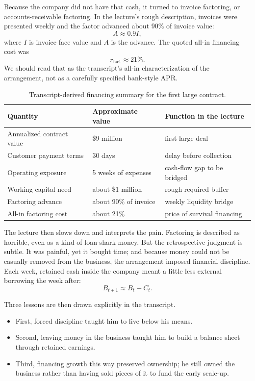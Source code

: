 Because the company did not have that cash, it turned to invoice factoring, or accounts-receivable factoring. In the lecture's rough description, invoices were presented weekly and the factor advanced about \(90\%\) of invoice value:
\begin{equation}
A \approx 0.9I,
\end{equation}
where \(I\) is invoice face value and \(A\) is the advance. The quoted all-in financing cost was
\begin{equation}
r_{\mathrm{fact}} \approx 21\%.
\end{equation}
We should read that as the transcript's all-in characterization of the arrangement, not as a carefully specified bank-style APR.

\begin{table}[h]
\centering
\begin{tabular}{lll}
\hline
Quantity & Approximate value & Function in the lecture \\
\hline
Annualized contract value & \$9 million & first large deal \\
Customer payment terms & 30 days & delay before collection \\
Operating exposure & 5 weeks of expenses & cash-flow gap to be bridged \\
Working-capital need & about \$1 million & rough required buffer \\
Factoring advance & about 90\% of invoice & weekly liquidity bridge \\
All-in factoring cost & about 21\% & price of survival financing \\
\hline
\end{tabular}
\caption{Transcript-derived financing summary for the first large contract.}
\end{table}

The lecture then slows down and interprets the pain. Factoring is described as horrible, even as a kind of loan-shark money. But the retrospective judgment is subtle. It was painful, yet it bought time; and because money could not be casually removed from the business, the arrangement imposed financial discipline. Each week, retained cash inside the company meant a little less external borrowing the week after:
\begin{equation}
B_{t+1}\approx B_t - C_t.
\end{equation}

Three lessons are then drawn explicitly in the transcript.
\begin{itemize}
\item First, forced discipline taught him to live below his means.
\item Second, leaving money in the business taught him to build a balance sheet through retained earnings.
\item Third, financing growth this way preserved ownership; he still owned the business rather than having sold pieces of it to fund the early scale-up.
\end{itemize}


